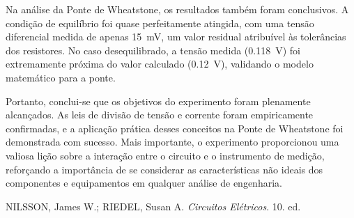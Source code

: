 \documentclass[a4paper, 12pt]{article}
\begin{document}
Na análise da Ponte de Wheatstone, os resultados também foram conclusivos. A condição de equilíbrio foi quase perfeitamente atingida, com uma tensão diferencial medida de apenas \SI{15}{\milli\volt}, um valor residual atribuível às tolerâncias dos resistores. No caso desequilibrado, a tensão medida (\SI{0,118}{\volt}) foi extremamente próxima do valor calculado (\SI{0,12}{\volt}), validando o modelo matemático para a ponte.

Portanto, conclui-se que os objetivos do experimento foram plenamente alcançados. As leis de divisão de tensão e corrente foram empiricamente confirmadas, e a aplicação prática desses conceitos na Ponte de Wheatstone foi demonstrada com sucesso. Mais importante, o experimento proporcionou uma valiosa lição sobre a interação entre o circuito e o instrumento de medição, reforçando a importância de se considerar as características não ideais dos componentes e equipamentos em qualquer análise de engenharia.

\begin{thebibliography}{9}

NILSSON, James W.; RIEDEL, Susan A. \textit{Circuitos Elétricos}. 10. ed.

\end{thebibliography}
\end{document}
